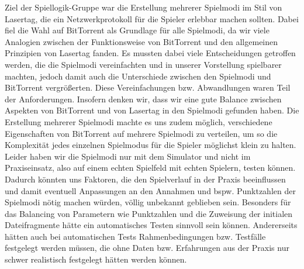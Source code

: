 Ziel der Spiellogik-Gruppe war die Erstellung mehrerer Spielmodi im Stil von Lasertag, die ein Netzwerkprotokoll für die Spieler erlebbar machen sollten. Dabei fiel die Wahl auf BitTorrent als Grundlage für alle Spielmodi, da wir viele Analogien zwischen der Funktionsweise von BitTorrent und den allgemeinen Prinzipien von Lasertag fanden. Es mussten dabei viele Entscheidungen getroffen werden, die die Spielmodi vereinfachten und in unserer Vorstellung spielbarer machten, jedoch damit auch die Unterschiede zwischen den Spielmodi und BitTorrent vergrößerten. Diese Vereinfachungen bzw. Abwandlungen waren Teil der Anforderungen. Insofern denken wir, dass wir eine gute Balance zwischen Aspekten von BitTorrent und von Lasertag in den Spielmodi gefunden haben. Die Erstellung mehrerer Spielmodi machte es uns zudem möglich, verschiedene Eigenschaften von BitTorrent auf mehrere Spielmodi zu verteilen, um so die Komplexität jedes einzelnen Spielmodus für die Spieler möglichst klein zu halten.
Leider haben wir die Spielmodi nur mit dem Simulator und nicht im Praxiseinsatz, also auf einem echten Spielfeld mit echten Spielern, testen können. Dadurch könnten uns Faktoren, die den Spielverlauf in der Praxis beeinflussen und damit eventuell Anpassungen an den Annahmen und bspw. Punktzahlen der Spielmodi nötig machen würden, völlig unbekannt geblieben sein.
Besonders für das Balancing von Parametern wie Punktzahlen und die Zuweisung der initialen Dateifragmente hätte ein automatisches Testen sinnvoll sein können. Andererseits hätten auch bei automatischen Tests Rahmenbedingungen bzw. Testfälle festgelegt werden müssen, die ohne Daten bzw. Erfahrungen aus der Praxis nur schwer realistisch festgelegt hätten werden können.

